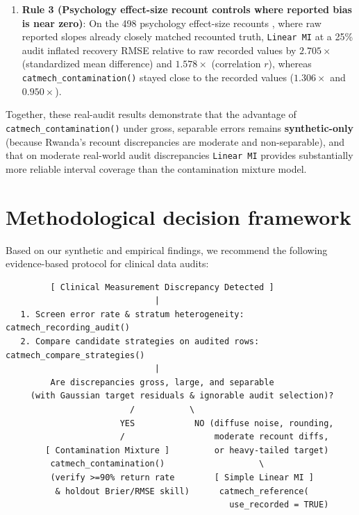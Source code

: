 \documentclass[
]{article}
\begin{document}
\begin{enumerate}
  for \texttt{Linear\ MI}), and \textbf{49.7\%} on the size-dependent
  \texttt{ANC\ 4th\ visit} stress slope (RMSE \(0.124\) vs.~\(0.085\)
  for \texttt{Linear\ MI}, retaining 63\% of reported bias). Across all
  20 Rwanda cells, \texttt{catmech\_contamination()} was closest to 95\%
  coverage in only 1 of 20 cells (worst case 35.4\%), compared to 10 of
  20 cells for \texttt{Linear\ MI} (worst case 79.5\%), and per-record
  error AUCs were 0.501 to 0.582.
\item
  \textbf{Rule 3 (Psychology effect-size recount controls where reported
  bias is near zero)}: On the 498 psychology effect-size recounts
  \citep{maassen2020reproducibility}, where raw reported slopes already
  closely matched recounted truth, \texttt{Linear\ MI} at a 25\% audit
  inflated recovery RMSE relative to raw recorded values by
  \textbf{\(2.705\times\)} (standardized mean difference) and
  \textbf{\(1.578\times\)} (correlation \(r\)), whereas
  \texttt{catmech\_contamination()} stayed close to the recorded values
  (\(1.306\times\) and \(0.950\times\)).
\end{enumerate}

Together, these real-audit results demonstrate that the advantage of
\texttt{catmech\_contamination()} under gross, separable errors remains
\textbf{synthetic-only} (because Rwanda's recount discrepancies are
moderate and non-separable), and that on moderate real-world audit
discrepancies \texttt{Linear\ MI} provides substantially more reliable
interval coverage than the contamination mixture model.

\section{Methodological decision
framework}\label{methodological-decision-framework}

Based on our synthetic and empirical findings, we recommend the
following evidence-based protocol for clinical data audits:

\begin{verbatim}
         [ Clinical Measurement Discrepancy Detected ]
                              |
   1. Screen error rate & stratum heterogeneity: catmech_recording_audit()
   2. Compare candidate strategies on audited rows: catmech_compare_strategies()
                              |
         Are discrepancies gross, large, and separable
     (with Gaussian target residuals & ignorable audit selection)?
                         /           \
                       YES            NO (diffuse noise, rounding,
                       /                  moderate recount diffs,
        [ Contamination Mixture ]         or heavy-tailed target)
         catmech_contamination()                   \
         (verify >=90% return rate        [ Simple Linear MI ]
          & holdout Brier/RMSE skill)      catmech_reference(
                                             use_recorded = TRUE)
\end{verbatim}
\end{document}
